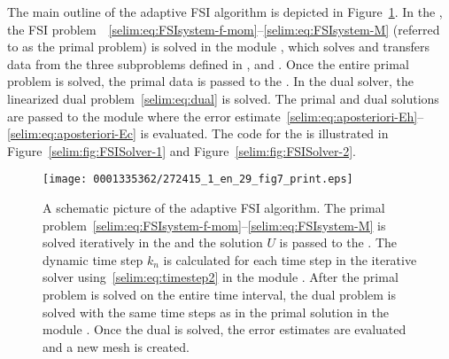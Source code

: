 The main outline of the adaptive FSI algorithm is depicted in
Figure~\ref{selim:fig:adaptiveMAP}. In the , the FSI
problem~~\eqref{selim:eq:FSIsystem-f-mom}--\eqref{selim:eq:FSIsystem-M}
(referred to as the primal problem)
is solved in the module , which solves and
transfers data from the three subproblems defined in
,  and . Once
the entire primal problem is solved, the primal data is passed to the
. In the dual solver, the linearized dual
problem~\eqref{selim:eq:dual} is solved. The primal and dual solutions
are passed to the module  where the error
estimate~\eqref{selim:eq:aposteriori-Eh}--\eqref{selim:eq:aposteriori-Ec} is evaluated. The code for the
 is illustrated in
Figure~\ref{selim:fig:FSISolver-1} and Figure~\ref{selim:fig:FSISolver-2}.


\begin{figure}[!p]
\vspace*{-8pt}
\centering
  \texttt{[image: 0001335362/272415\_1\_en\_29\_fig7\_print.eps]}
  \caption{A schematic picture of the adaptive FSI algorithm. The primal
    problem~\eqref{selim:eq:FSIsystem-f-mom}--\eqref{selim:eq:FSIsystem-M}
 is solved iteratively in the
     and the solution $U$ is passed to the
    . The dynamic time step $k_n$ is calculated for
    each time step in the iterative solver 
    using~\eqref{selim:eq:timestep2} in the module
    . After the primal problem is solved on the entire
    time interval, the dual problem is solved with the same time steps
    as in the primal solution in the module . Once
    the dual is solved, the error estimates are evaluated and a new mesh
    is created.}
  \label{selim:fig:adaptiveMAP}
\end{figure}

